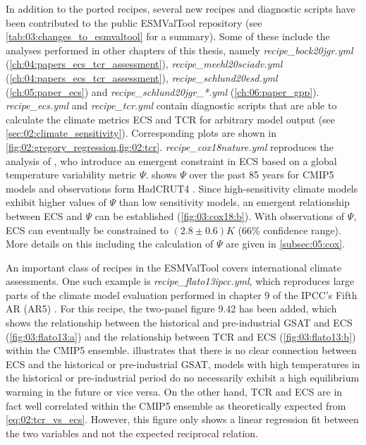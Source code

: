 In addition to the ported recipes, several new recipes and diagnostic scripts
have been contributed to the public \ac{ESMValTool} repository (see
\cref{tab:03:changes_to_esmvaltool} for a summary). Some of these include the
analyses performed in other chapters of this thesis, namely
\emph{recipe\_bock20jgr.yml} (\cref{ch:04:papers_ecs_tcr_assessment}),
\emph{recipe\_meehl20sciadv.yml} (\cref{ch:04:papers_ecs_tcr_assessment}),
\emph{recipe\_schlund20esd.yml} (\cref{ch:05:paper_ecs}) and
\emph{recipe\_schlund20jgr\_*.yml} (\cref{ch:06:paper_gpp}).
\emph{recipe\_ecs.yml} and \emph{recipe\_tcr.yml} contain diagnostic scripts
that are able to calculate the climate metrics \ac{ECS} and \ac{TCR} for
arbitrary model output (see \cref{sec:02:climate_sensitivity}). Corresponding
plots are shown in \cref{fig:02:gregory_regression,fig:02:tcr}.
\emph{recipe\_cox18nature.yml} reproduces the analysis of \textcite{Cox2018},
who introduce an emergent constraint in \ac{ECS} based on a global temperature
variability metric $\Psi$.  shows $\Psi$ over the past 85
years for \acs{CMIP}5 models and observations form HadCRUT4
\autocite{Morice2012}. Since high-sensitivity climate models exhibit higher
values of $\Psi$ than low sensitivity models, an emergent relationship between
\ac{ECS} and $\Psi$ can be established (\cref{fig:03:cox18:b}). With
observations of $\Psi$, \ac{ECS} can eventually be constrained to $\left( 2.8
\pm 0.6 \right) \unit{K}$ ($66 \unit{\%}$ confidence range). More details on
this including the calculation of $\Psi$ are given in \cref{subsec:05:cox}.

An important class of recipes in the \ac{ESMValTool} covers international
climate assessments. One such example is \emph{recipe\_flato13ipcc.yml}, which
reproduces large parts of the climate model evaluation performed in chapter 9
of the \ac{IPCC}'s Fifth \acl{AR} (\acs{AR}5) \autocite{Flato2013}. For this
recipe, the two-panel figure 9.42 has been added, which shows the relationship
between the historical and pre-industrial \ac{GSAT} and \ac{ECS}
(\cref{fig:03:flato13:a}) and the relationship between \ac{TCR} and \ac{ECS}
(\cref{fig:03:flato13:b}) within the \acs{CMIP}5 ensemble.
 illustrates that there is no clear connection between
\ac{ECS} and the historical or pre-industrial \ac{GSAT}, \ie{} models with high
temperatures in the historical or pre-industrial period do no necessarily
exhibit a high equilibrium warming in the future or vice versa. On the other
hand, \ac{TCR} and \ac{ECS} are in fact well correlated within the \acs{CMIP}5
ensemble as theoretically expected from \cref{eq:02:tcr_vs_ecs}. However, this
figure only shows a linear regression fit between the two variables and not the
expected reciprocal relation.

